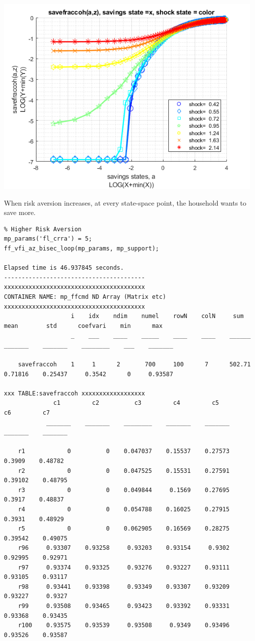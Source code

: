 \documentclass[
]{book}
\begin{document}
\includegraphics[width=5.20833in,height=\textheight]{img/fx_vfi_az_bisec_loop_images/figure_3.png}

When risk aversion increases, at every state-space point, the household
wants to save more.

\begin{verbatim}
% Higher Risk Aversion
mp_params('fl_crra') = 5;
ff_vfi_az_bisec_loop(mp_params, mp_support);

Elapsed time is 46.937845 seconds.
----------------------------------------
xxxxxxxxxxxxxxxxxxxxxxxxxxxxxxxxxxxxxxxx
CONTAINER NAME: mp_ffcmd ND Array (Matrix etc)
xxxxxxxxxxxxxxxxxxxxxxxxxxxxxxxxxxxxxxxx
                   i    idx    ndim    numel    rowN    colN     sum       mean        std      coefvari    min      max  
                   _    ___    ____    _____    ____    ____    ______    _______    _______    ________    ___    _______

    savefraccoh    1     1      2       700     100      7      502.71    0.71816    0.25437     0.3542      0     0.93587

xxx TABLE:savefraccoh xxxxxxxxxxxxxxxxxx
              c1         c2          c3         c4         c5         c6         c7   
            _______    _______    ________    _______    _______    _______    _______

    r1            0          0    0.047037    0.15537    0.27573     0.3909    0.48782
    r2            0          0    0.047525    0.15531    0.27591    0.39102    0.48795
    r3            0          0    0.049844     0.1569    0.27695     0.3917    0.48837
    r4            0          0    0.054788    0.16025    0.27915     0.3931    0.48929
    r5            0          0    0.062905    0.16569    0.28275    0.39542    0.49075
    r96     0.93307    0.93258     0.93203    0.93154     0.9302    0.92995    0.92971
    r97     0.93374    0.93325     0.93276    0.93227    0.93111    0.93105    0.93117
    r98     0.93441    0.93398     0.93349    0.93307    0.93209    0.93227     0.9327
    r99     0.93508    0.93465     0.93423    0.93392    0.93331    0.93368    0.93435
    r100    0.93575    0.93539     0.93508     0.9349    0.93496    0.93526    0.93587
\end{verbatim}
\end{document}
